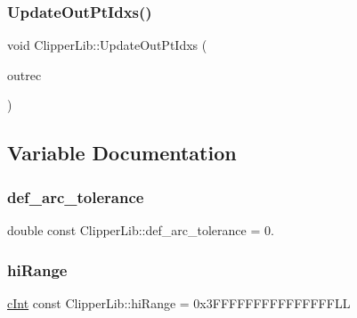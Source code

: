 \mbox{\label{namespace_clipper_lib_a06a3e837b8fbaa3fc7e2640a8e4fe4a2}} 
\subsubsection{\texorpdfstring{UpdateOutPtIdxs()}{UpdateOutPtIdxs()}}
{\footnotesize\ttfamily void Clipper\+Lib\+::\+Update\+Out\+Pt\+Idxs (\begin{DoxyParamCaption}\item[{\mbox{\hyperlink{struct_clipper_lib_1_1_out_rec}{Out\+Rec}} \&}]{outrec }\end{DoxyParamCaption})\hspace{0.3cm}{\ttfamily [inline]}}



\subsection{Variable Documentation}
\mbox{\label{namespace_clipper_lib_ab44dd4f071b7d92294a2af242e8c70d4}} 
\subsubsection{\texorpdfstring{def\_arc\_tolerance}{def\_arc\_tolerance}}
{\footnotesize\ttfamily double const Clipper\+Lib\+::def\+\_\+arc\+\_\+tolerance = 0.\hspace{0.3cm}{\ttfamily [static]}}

\mbox{\label{namespace_clipper_lib_a65945fbc810bff7fd44c981b06e4473e}} 
\subsubsection{\texorpdfstring{hiRange}{hiRange}}
{\footnotesize\ttfamily \mbox{\hyperlink{namespace_clipper_lib_a7156730a24951629192d4831334bafaa}{c\+Int}} const Clipper\+Lib\+::hi\+Range = 0x3\+F\+F\+F\+F\+F\+F\+F\+F\+F\+F\+F\+F\+F\+F\+F\+LL\hspace{0.3cm}{\ttfamily [static]}}

